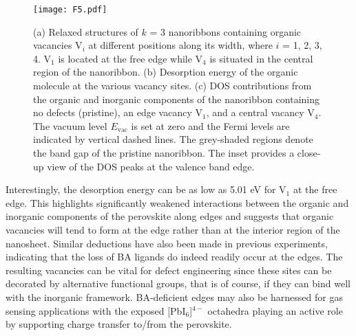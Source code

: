 \documentclass[aps,prl,preprint,11pt,superscriptaddress,bibnotes,amsmath,amssymb,amsfonts,showkeys]{revtex4-2}
\begin{document}
\begin{figure*}
\texttt{[image: F5.pdf]}
\caption{(a) Relaxed structures of $k$ = 3 nanoribbons containing organic vacancies V$_i$ at different positions along its width, where $i$ = 1, 2, 3, 4. V$_1$ is located at the free edge while V$_4$ is situated in the central region of the nanoribbon. (b) Desorption energy of the organic molecule at the various vacancy sites. (c) DOS contributions from the organic and inorganic components of the nanoribbon containing no defects (pristine), an edge vacancy V$_1$, and a central vacancy V$_4$. The vacuum level $E_{\text{vac}}$ is set at zero and the Fermi levels are indicated by vertical dashed lines. The grey-shaded regions denote the band gap of the pristine nanoribbon. The inset provides a close-up view of the DOS peaks at the valence band edge. \label{HRPP_desorption}}
\end{figure*}

Interestingly, the desorption energy can be as low as 5.01 eV for V$_1$ at the free edge. This highlights significantly weakened interactions between the organic and inorganic components of the perovskite along edges and suggests that organic vacancies will tend to form at the edge rather than at the interior region of the nanosheet. Similar deductions have also been made in previous experiments, indicating that the loss of BA ligands do indeed readily occur at the edges.\cite{QDhetedge20,ZTrevcon19} The resulting vacancies can be vital for defect engineering since these sites can be decorated by alternative functional groups, that is of course, if they can bind well with the inorganic framework. BA-deficient edges may also be harnessed for gas sensing applications with the exposed [PbI$_6$]$^{4-}$ octahedra playing an active role by supporting charge transfer to/from the perovskite.
\end{document}
